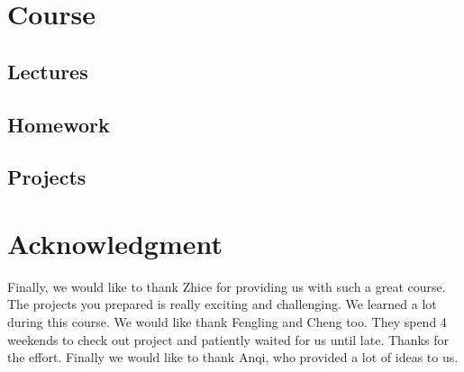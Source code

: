 \documentclass[conference,compsoc]{IEEEtran}
\begin{document}
\section{Course}
	
	\subsection{Lectures}
	
	\subsection{Homework}

	\subsection{Projects}

\section*{Acknowledgment}
	Finally, we would like to thank Zhice for providing us with such a great course.
	The projects you prepared is really exciting and challenging. 
	We learned a lot during this course.
	We would like thank Fengling and Cheng too. 
	They spend 4 weekends to check out project and patiently waited for us until late.
	Thanks for the effort.
	Finally we would like to thank Anqi, who provided a lot of ideas to us.





\end{document}
